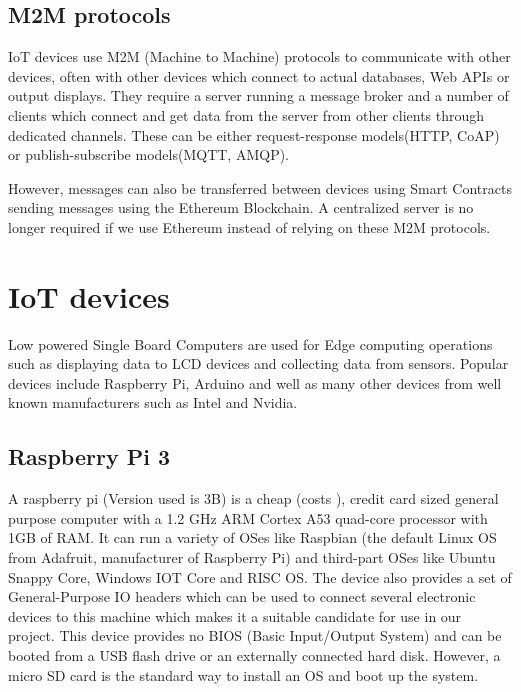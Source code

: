 \documentclass[11pt,openright]{report}
\begin{document}
\subsection{M2M protocols}
IoT devices use M2M (Machine to Machine) protocols to communicate with other devices, often with other devices which connect to actual databases, Web APIs or output displays. They require a server running a message broker and a number of clients which connect and get data from the server from other clients through dedicated channels. These can be either request-response models(HTTP, CoAP) or publish-subscribe models(MQTT, AMQP).

However, messages can also be transferred between devices using Smart Contracts sending messages using the Ethereum Blockchain. A centralized server is no longer required if we use Ethereum instead of relying on these M2M protocols.

\section{IoT devices}
Low powered Single Board Computers are used for Edge computing operations such as displaying data to LCD devices and collecting data from sensors. Popular devices include Raspberry Pi, Arduino and well as many other devices from well known manufacturers such as Intel and Nvidia.

\subsection{Raspberry Pi 3}
A raspberry pi (Version used is 3B) is a cheap (costs ), credit card sized general purpose computer with a 1.2 GHz ARM Cortex A53 quad-core processor with 1GB of RAM. It can run a variety of OSes like Raspbian (the default Linux OS from Adafruit, manufacturer of Raspberry Pi) and third-part OSes like Ubuntu Snappy Core, Windows IOT Core and RISC OS. The device also provides a set of General-Purpose IO headers which can be used to connect several electronic devices to this machine which makes it a suitable candidate for use in our project. This device provides no BIOS (Basic Input/Output System) and can be booted from a USB flash drive or an externally connected hard disk. However, a micro SD card is the standard way to install an OS and boot up the system.  
\end{document}
